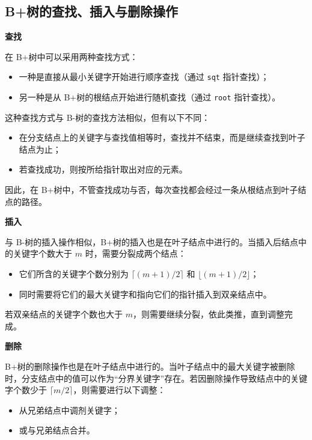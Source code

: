 \documentclass[lang=cn,newtx,10pt,scheme=chinese]{../elegantbook}
\begin{document}
   \subsection{B+树的查找、插入与删除操作}

   \textbf{查找}
   
      在 B+树中可以采用两种查找方式：
      \begin{itemize}
        \item 一种是直接从最小关键字开始进行顺序查找（通过 \texttt{sqt} 指针查找）；
        \item 另一种是从 B+树的根结点开始进行随机查找（通过 \texttt{root} 指针查找）。
      \end{itemize}
   
      这种查找方式与 B-树的查找方法相似，但有以下不同：
      \begin{itemize}
        \item 在分支结点上的关键字与查找值相等时，查找并不结束，而是继续查找到叶子结点为止；
        \item 若查找成功，则按所给指针取出对应的元素。
      \end{itemize}
   
      因此，在 B+树中，不管查找成功与否，每次查找都会经过一条从根结点到叶子结点的路径。
   
   
    \textbf{插入}

      与 B-树的插入操作相似，B+树的插入也是在叶子结点中进行的。当插入后结点中的关键字个数大于 $m$ 时，需要分裂成两个结点：
      \begin{itemize}
        \item 它们所含的关键字个数分别为 $\lceil (m+1)/2 \rceil$ 和 $\lfloor (m+1)/2 \rfloor$；
        \item 同时需要将它们的最大关键字和指向它们的指针插入到双亲结点中。
      \end{itemize}
   
      若双亲结点的关键字个数也大于 $m$，则需要继续分裂，依此类推，直到调整完成。
   
   
    \textbf{删除}

      B+树的删除操作也是在叶子结点中进行的。当叶子结点中的最大关键字被删除时，分支结点中的值可以作为“分界关键字”存在。若因删除操作导致结点中的关键字个数少于 $\lceil m/2 \rceil$，则需要进行以下调整：
      \begin{itemize}
        \item 从兄弟结点中调剂关键字；
        \item 或与兄弟结点合并。
      \end{itemize}
   
\end{document}
